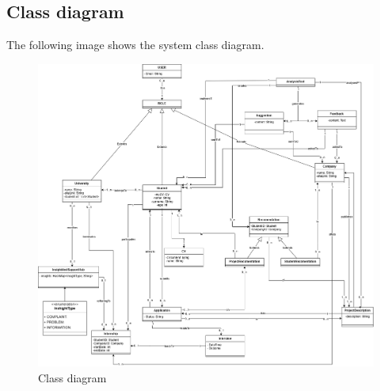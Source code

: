 \subsection{Class diagram}
The following image shows the system class diagram.
\begin{figure}[H]
    \centering
    \includegraphics[width=1\linewidth]{RASD//Images/UML.drawio.png}
    \caption{Class diagram}
\end{figure}

\pagebreak
